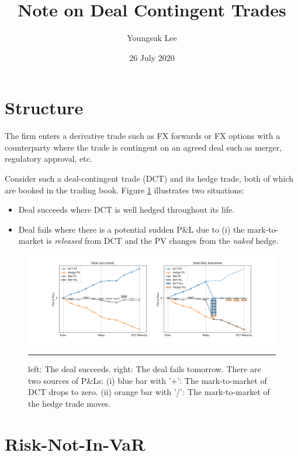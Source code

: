 \documentclass[10pt,a4paper]{article}
\begin{document}
\title{Note on Deal Contingent Trades}
\author{Youngsuk Lee}
\date{26 July 2020}
\maketitle

\section{Structure}

The firm enters a derivative trade such as FX forwards or FX options with a counterparty where the trade is contingent on an agreed deal such as merger, regulatory approval, etc. 

Consider such a deal-contingent trade (DCT) and its hedge trade, both of which are booked in the trading book. Figure 
\ref{fig:dct-illustration} illustrates two situations:
\begin{itemize}
	\item Deal succeeds where DCT is well hedged throughout its life.  
	\item Deal fails where there is a potential sudden P\&L due to (i) the mark-to-market is {\em released} from DCT and 
	the PV changes from the {\em naked} hedge. 
\end{itemize}

\begin{figure}[h!]
	\begin{center}
		\includegraphics[width=18cm]{figs/dct-illustration.png}
	\end{center}
	\caption{
		left: The deal succeeds. right: The deal fails tomorrow. There are two sources of P\&Ls: (i) blue bar with '+': The mark-to-market of DCT drops to zero.
		(ii) orange bar with '/': The mark-to-market of the hedge trade moves. 
	}
	\label{fig:dct-illustration}	
	\hrule
\end{figure}

\section{Risk-Not-In-VaR}
\end{document}
